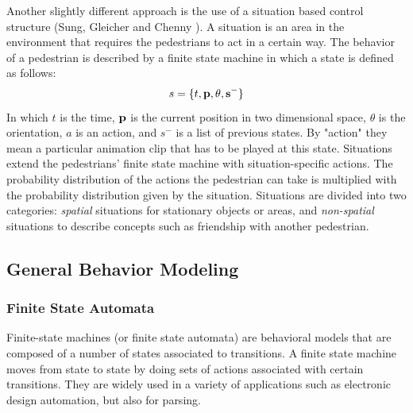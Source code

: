 \documentclass[11pt]{book}
\begin{document}
Another slightly different approach is the use of a situation based control structure (Sung, Gleicher and Chenny \cite{Sung04scalablebehaviors}). A situation is an area in the environment that requires the pedestrians to act in a certain way. The behavior of a pedestrian is described by a finite state machine in which a state is defined as follows:
 \[s = \{t, \bf{p}, \theta, s^- \}\]
In which $t$ is the time, $\bf{p}$ is the current position in two dimensional space, $\theta$ is the orientation, $a$ is an action, and $s^-$ is a list of previous states. By "action" they mean a particular animation clip that has to be played at this state. Situations extend the pedestrians' finite state machine with situation-specific actions. The probability distribution of the actions the pedestrian can take is multiplied with the probability distribution given by the situation. Situations are divided into two categories: \emph{spatial} situations for stationary objects or areas, and \emph{non-spatial} situations to describe concepts such as friendship with another pedestrian.



\subsection{General Behavior Modeling}
\subsubsection{Finite State Automata}
Finite-state machines (or finite state automata) are behavioral models that are composed of a number of states associated to transitions. A finite state machine moves from state to state by doing sets of actions associated with certain transitions. They are widely used in a variety of applications such as electronic design automation, but also for parsing.
\end{document}
